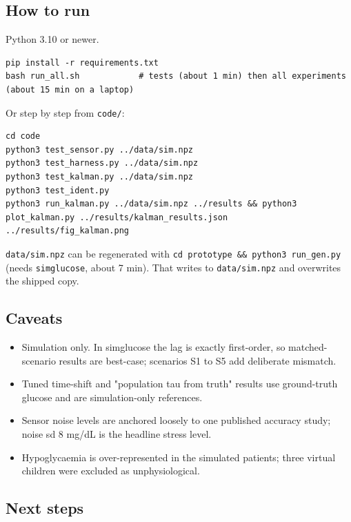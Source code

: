 \documentclass[11pt,a4paper]{article}
\providecommand{\tightlist}{\setlength{\itemsep}{0pt}\setlength{\parskip}{0pt}}
\begin{document}
\hypertarget{how-to-run}{%
\subsection{How to run}\label{how-to-run}}

Python 3.10 or newer.

\begin{verbatim}
pip install -r requirements.txt
bash run_all.sh            # tests (about 1 min) then all experiments (about 15 min on a laptop)
\end{verbatim}

Or step by step from \texttt{code/}:

\begin{verbatim}
cd code
python3 test_sensor.py ../data/sim.npz
python3 test_harness.py ../data/sim.npz
python3 test_kalman.py ../data/sim.npz
python3 test_ident.py
python3 run_kalman.py ../data/sim.npz ../results && python3 plot_kalman.py ../results/kalman_results.json ../results/fig_kalman.png
\end{verbatim}

\texttt{data/sim.npz} can be regenerated with
\texttt{cd\ prototype\ \&\&\ python3\ run\_gen.py} (needs
\texttt{simglucose}, about 7 min). That writes to \texttt{data/sim.npz}
and overwrites the shipped copy.

\hypertarget{caveats}{%
\subsection{Caveats}\label{caveats}}

\begin{itemize}
\tightlist
\item
  Simulation only. In simglucose the lag is exactly first-order, so
  matched-scenario results are best-case; scenarios S1 to S5 add
  deliberate mismatch.
\item
  Tuned time-shift and "population tau from truth" results use
  ground-truth glucose and are simulation-only references.
\item
  Sensor noise levels are anchored loosely to one published accuracy
  study; noise sd 8 mg/dL is the headline stress level.
\item
  Hypoglycaemia is over-represented in the simulated patients; three
  virtual children were excluded as unphysiological.
\end{itemize}

\hypertarget{next-steps}{%
\subsection{Next steps}\label{next-steps}}
\end{document}
